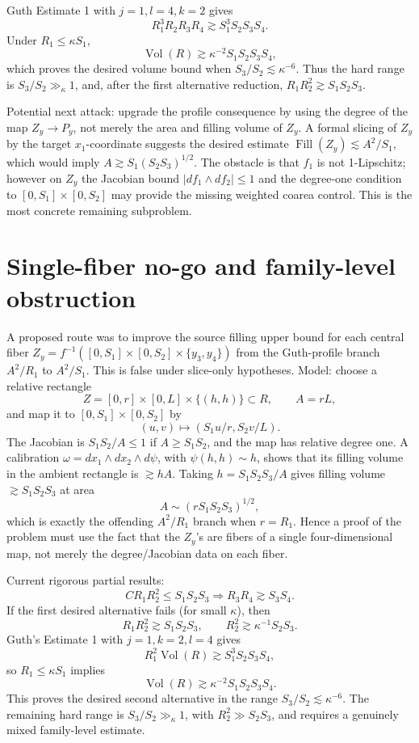 \documentclass[12pt]{article}
\newcommand{\Vol}{\operatorname{Vol}}
\newcommand{\Fill}{\operatorname{Fill}}
\begin{document}
Guth Estimate 1 with \(j=1,l=4,k=2\) gives
\[
R_1^3R_2R_3R_4\gtrsim S_1^3S_2S_3S_4.
\]
Under \(R_1\le\kappa S_1\),
\[
\Vol(R)\gtrsim \kappa^{-2}S_1S_2S_3S_4,
\]
which proves the desired volume bound when \(S_3/S_2\lesssim \kappa^{-6}\).
Thus the hard range is \(S_3/S_2\gg_\kappa1\), and, after the first alternative
reduction, \(R_1R_2^2\gtrsim S_1S_2S_3\).

Potential next attack: upgrade the profile consequence by using the degree of
the map \(Z_y\to P_y\), not merely the area and filling volume of \(Z_y\).  A
formal slicing of \(Z_y\) by the target \(x_1\)-coordinate suggests the desired
estimate \( \Fill(Z_y)\lesssim A^2/S_1\), which would imply
\(A\gtrsim S_1(S_2S_3)^{1/2}\).  The obstacle is that \(f_1\) is not
1-Lipschitz; however on \(Z_y\) the Jacobian bound
\(|df_1\wedge df_2|\le1\) and the degree-one condition to
\([0,S_1]\times[0,S_2]\) may provide the missing weighted coarea control.
This is the most concrete remaining subproblem.




\section*{Single-fiber no-go and family-level obstruction}

A proposed route was to improve the source filling upper bound for each central
fiber \(Z_y=f^{-1}([0,S_1]\times[0,S_2]\times\{y_3,y_4\})\) from the Guth-profile
branch \(A^2/R_1\) to \(A^2/S_1\).  This is false under slice-only hypotheses.
Model: choose a relative rectangle
\[
Z=[0,r]\times[0,L]\times\{(h,h)\}\subset R,\qquad A=rL,
\]
and map it to \([0,S_1]\times[0,S_2]\) by
\[
(u,v)\mapsto(S_1u/r,S_2v/L).
\]
The Jacobian is \(S_1S_2/A\le1\) if \(A\ge S_1S_2\), and the map has relative
degree one.  A calibration \(\omega=dx_1\wedge dx_2\wedge d\psi\), with
\(\psi(h,h)\sim h\), shows that its filling volume in the ambient rectangle is
\(\gtrsim hA\).  Taking \(h=S_1S_2S_3/A\) gives filling volume
\(\gtrsim S_1S_2S_3\) at area
\[
A\sim (rS_1S_2S_3)^{1/2},
\]
which is exactly the offending \(A^2/R_1\) branch when \(r=R_1\).  Hence a proof
of the problem must use the fact that the \(Z_y\)'s are fibers of a single
four-dimensional map, not merely the degree/Jacobian data on each fiber.

Current rigorous partial results:
\[
CR_1R_2^2\le S_1S_2S_3 \Longrightarrow R_3R_4\gtrsim S_3S_4.
\]
If the first desired alternative fails (for small \(\kappa\)), then
\[
R_1R_2^2\gtrsim S_1S_2S_3,\qquad
R_2^2\gtrsim \kappa^{-1}S_2S_3.
\]
Guth's Estimate 1 with \(j=1,k=2,l=4\) gives
\[
R_1^2\operatorname{Vol}(R)\gtrsim S_1^3S_2S_3S_4,
\]
so \(R_1\le\kappa S_1\) implies
\[
\operatorname{Vol}(R)\gtrsim \kappa^{-2}S_1S_2S_3S_4.
\]
This proves the desired second alternative in the range
\(S_3/S_2\lesssim\kappa^{-6}\).  The remaining hard range is
\(S_3/S_2\gg_\kappa1\), with \(R_2^2\gg S_2S_3\), and requires a genuinely mixed
family-level estimate.
\end{document}
